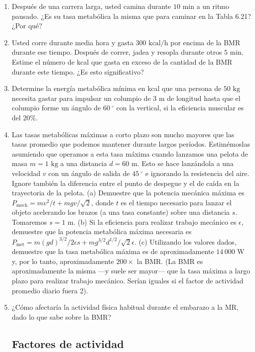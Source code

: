 \documentclass[12pt]{book}
\begin{document}
\begin{enumerate}
\item[6.78] Después de una carrera larga, usted camina durante $10\text{ min}$ a un ritmo pausado. ¿Es su tasa metabólica la misma que para caminar en la Tabla 6.21? ¿Por qué?

\item[6.79] Usted corre durante media hora y gasta $300\text{ kcal/h}$ por encima de la BMR durante ese tiempo. Después de correr, jadea y resopla durante otros $5\text{ min}$. Estime el número de kcal que gasta en exceso de la cantidad de la BMR durante este tiempo. ¿Es esto significativo?

\item[6.80] Determine la energía metabólica mínima en kcal que una persona de $50\text{ kg}$ necesita gastar para impulsar un columpio de $3\text{ m}$ de longitud hasta que el columpio forme un ángulo de $60\ ^\circ$ con la vertical, si la eficiencia muscular es del $20\%$.

\item[6.81] Las tasas metabólicas máximas a corto plazo son mucho mayores que las tasas promedio que podemos mantener durante largos períodos. Estimémoslas asumiendo que operamos a esta tasa máxima cuando lanzamos una pelota de masa $m = 1\text{ kg}$ a una distancia $d = 60\text{ m}$. Esto se hace lanzándola a una velocidad $v$ con un ángulo de salida de $45\ ^\circ$ e ignorando la resistencia del aire. Ignore también la diferencia entre el punto de despegue y el de caída en la trayectoria de la pelota. (a) Demuestre que la potencia mecánica máxima es $P_{\text{mech}} = mv^2/t + mgv/\sqrt{2}$, donde $t$ es el tiempo necesario para lanzar el objeto acelerando los brazos (a una tasa constante) sobre una distancia $s$. Tomaremos $s = 1\text{ m}$. (b) Si la eficiencia para realizar trabajo mecánico es $\epsilon$, demuestre que la potencia metabólica máxima necesaria es $P_{\text{met}} = m(gd)^{3/2}/2\epsilon s + mg^{3/2}d^{1/2}/\sqrt{2}\epsilon$. (c) Utilizando los valores dados, demuestre que la tasa metabólica máxima es de aproximadamente $14\,000\text{ W}$ y, por lo tanto, aproximadamente $200\times$ la BMR. (La BMR es aproximadamente la misma ---y suele ser mayor--- que la tasa máxima a largo plazo para realizar trabajo mecánico. Serían iguales si el factor de actividad promedio diario fuera 2).

\item[6.82] ¿Cómo afectaría la actividad física habitual durante el embarazo a la MR, dado lo que sabe sobre la BMR?

\subsection*{Factores de actividad}


\end{enumerate}
\end{document}

